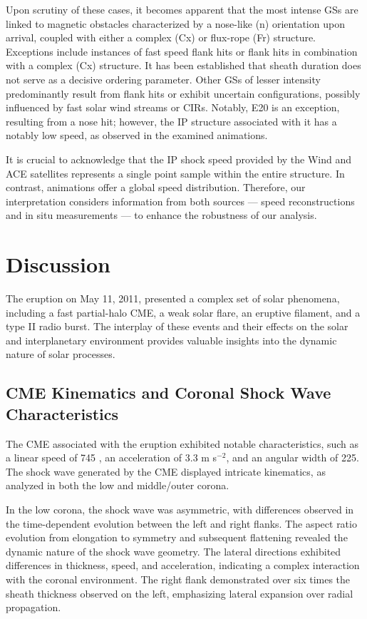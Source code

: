 Upon scrutiny of these cases, it becomes apparent that the most intense GSs are linked to magnetic obstacles characterized by a nose-like (n) orientation upon arrival, coupled with either a complex (Cx) or flux-rope (Fr) structure. Exceptions include instances of fast speed flank hits or flank hits in combination with a complex (Cx) structure. It has been established that sheath duration does not serve as a decisive ordering parameter. Other GSs of lesser intensity predominantly result from flank hits or exhibit uncertain configurations, possibly influenced by fast solar wind streams or CIRs. Notably, E20 is an exception, resulting from a nose hit; however, the IP structure associated with it has a notably low speed, as observed in the examined animations.

It is crucial to acknowledge that the IP shock speed provided by the Wind and ACE satellites represents a single point sample within the entire structure. In contrast, animations offer a global speed distribution. Therefore, our interpretation considers information from both sources — speed reconstructions and in situ measurements — to enhance the robustness of our analysis.

\section{Discussion}
The eruption on May 11, 2011, presented a complex set of solar phenomena, including a fast partial-halo CME, a weak solar flare, an eruptive filament, and a type II radio burst. The interplay of these events and their effects on the solar and interplanetary environment provides valuable insights into the dynamic nature of solar processes.

\subsection{CME Kinematics and Coronal Shock Wave Characteristics}
The CME associated with the eruption exhibited notable characteristics, such as a linear speed of 745 \kms, an acceleration of 3.3 m s$^{-2}$, and an angular width of 225\degree. The shock wave generated by the CME displayed intricate kinematics, as analyzed in both the low and middle/outer corona.

In the low corona, the shock wave was asymmetric, with differences observed in the time-dependent evolution between the left and right flanks. The aspect ratio evolution from elongation to symmetry and subsequent flattening revealed the dynamic nature of the shock wave geometry. The lateral directions exhibited differences in thickness, speed, and acceleration, indicating a complex interaction with the coronal environment. The right flank demonstrated over six times the sheath thickness observed on the left, emphasizing lateral expansion over radial propagation.

